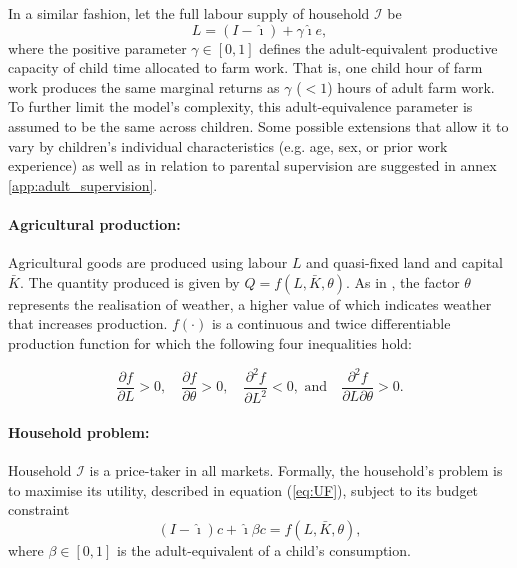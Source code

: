 \documentclass[a4paper,12pt]{article}
\theoremstyle{plain}
\theoremstyle{definition}
\theoremstyle{definition}
\theoremstyle{definition}
\theoremstyle{definition}
\begin{document}
In a similar fashion, let the full labour supply of household $\mathcal{I}$ be
\begin{equation}
    L=(I-\hat{\imath})+\gamma \hat{\imath}e,
\end{equation}
where the positive parameter $\gamma\in[0,1]$ defines the adult-equivalent productive capacity of child time allocated to farm work. That is, one child hour of farm work produces the same marginal returns as $\gamma$ ($<1$) hours of adult farm work. To further limit the model's complexity, this adult-equivalence parameter is assumed to be the same across children. Some possible extensions that allow it to vary by children's individual characteristics (e.g. age, sex, or prior work experience) as well as in relation to parental supervision are suggested in annex \ref{app:adult_supervision}.

\paragraph{Agricultural production:}
Agricultural goods are produced using labour $L$ and quasi-fixed land and capital $\bar{K}$. The quantity produced is given by $Q=f(L,\bar{K},\theta)$. As in \citet{ravallion1988}, the factor $\theta$ represents the realisation of weather, a higher value of which indicates weather that increases production. $f(\cdot)$ is a continuous and twice differentiable production function for which the following four inequalities hold:

\begin{equation}
\label{curvature}
    \frac{\partial f}{\partial L}>0, \quad \frac{\partial f}{\partial \theta}>0, \quad \frac{\partial^2 f}{\partial L^2}<0, \text{ and} \quad \frac{\partial^2 f}{\partial L \partial \theta}>0.
\end{equation}

\paragraph{Household problem:}

Household $\mathcal{I}$ is a price-taker in all markets. Formally, the household's problem is to maximise its utility, described in equation (\ref{eq:UF}), subject to its budget constraint
\begin{equation}
\label{eq:BudgetConstraint}
    (I-\hat{\imath})c+\hat{\imath}\beta c = f(L, \bar{K}, \theta),
\end{equation}
where $\beta\in[0,1]$ is the adult-equivalent of a child's consumption.
\end{document}
